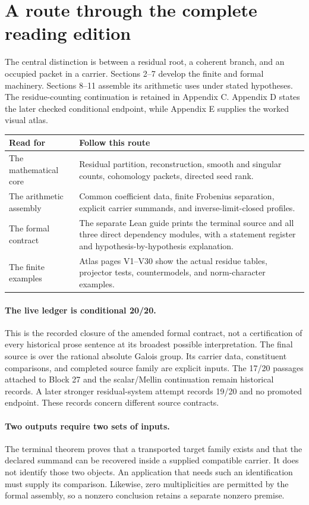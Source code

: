 \section*{A route through the complete reading edition}
The central distinction is between a residual root, a coherent branch, and an
occupied packet in a carrier. Sections 2--7 develop the finite and formal
machinery. Sections 8--11 assemble its arithmetic uses under stated hypotheses.
The residue-counting continuation is retained in Appendix C. Appendix D states
the later checked conditional endpoint, while Appendix E supplies the worked
visual atlas.

\begin{tabularx}{\linewidth}{@{}p{.24\linewidth}X@{}}\toprule
Read for & Follow this route\\\midrule
The mathematical core & Residual partition, reconstruction, smooth and singular counts, cohomology packets, directed seed rank.\\
The arithmetic assembly & Common coefficient data, finite Frobenius separation, explicit carrier summands, and inverse-limit-closed profiles.\\
The formal contract & The separate Lean guide prints the terminal source and all three direct dependency modules, with a statement register and hypothesis-by-hypothesis explanation.\\
The finite examples & Atlas pages V1--V30 show the actual residue tables, projector tests, countermodels, and norm-character examples.\\\bottomrule
\end{tabularx}

\paragraph{The live ledger is conditional 20/20.}
This is the recorded closure of the amended formal contract, not a certification
of every historical prose sentence at its broadest possible interpretation.
The final source is over the rational absolute Galois group. Its carrier data,
constituent comparisons, and completed source family are explicit inputs.
The 17/20 passages attached to Block 27 and the scalar/Mellin continuation remain
historical records. A later stronger residual-system attempt records 19/20 and
no promoted endpoint. These records concern different source contracts.

\paragraph{Two outputs require two sets of inputs.}
The terminal theorem proves that a transported target family exists and that the
declared summand can be recovered inside a supplied compatible carrier. It does
not identify those two objects. An application that needs such an identification
must supply its comparison. Likewise, zero multiplicities are permitted by the
formal assembly, so a nonzero conclusion retains a separate nonzero premise.

